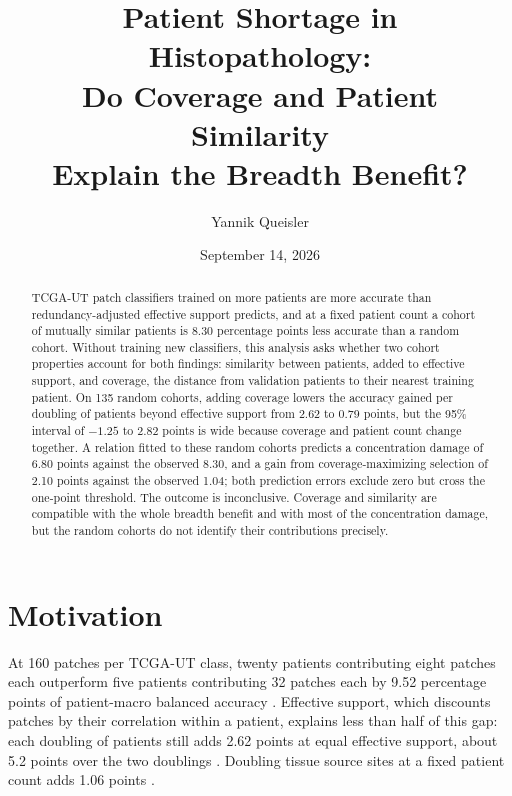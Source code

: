 \documentclass[11pt]{article}
\title{Patient Shortage in Histopathology:\\Do Coverage and Patient Similarity\\Explain the Breadth Benefit?}
\author{Yannik Queisler}
\date{September 14, 2026}
\begin{document}
\raggedbottom
{}
\setlength{\emergencystretch}{2em}
\maketitle
\begin{abstract}
\noindent TCGA-UT patch classifiers trained on more patients are more accurate than redundancy-adjusted effective support predicts, and at a fixed patient count a cohort of mutually similar patients is 8.30 percentage points less accurate than a random cohort. Without training new classifiers, this analysis asks whether two cohort properties account for both findings: similarity between patients, added to effective support, and coverage, the distance from validation patients to their nearest training patient. On 135 random cohorts, adding coverage lowers the accuracy gained per doubling of patients beyond effective support from 2.62 to 0.79 points, but the 95\% interval of $-1.25$ to 2.82 points is wide because coverage and patient count change together. A relation fitted to these random cohorts predicts a concentration damage of 6.80 points against the observed 8.30, and a gain from coverage-maximizing selection of 2.10 points against the observed 1.04; both prediction errors exclude zero but cross the one-point threshold. The outcome is inconclusive. Coverage and similarity are compatible with the whole breadth benefit and with most of the concentration damage, but the random cohorts do not identify their contributions precisely.
\end{abstract}
\setcounter{tocdepth}{1}
\tableofcontents
\clearpage

\section{Motivation}
\label{sec:motivation}
At 160 patches per TCGA-UT class, twenty patients contributing eight patches each outperform five patients contributing 32 patches each by 9.52 percentage points of patient-macro balanced accuracy \citep{queisler2026effectiveSupport}. Effective support, which discounts patches by their correlation within a patient, explains less than half of this gap: each doubling of patients still adds 2.62 points at equal effective support, about 5.2 points over the two doublings \citep{queisler2026multidirectionalRedundancy}. Doubling tissue source sites at a fixed patient count adds 1.06 points \citep{queisler2026siteCoverage}.
\end{document}
